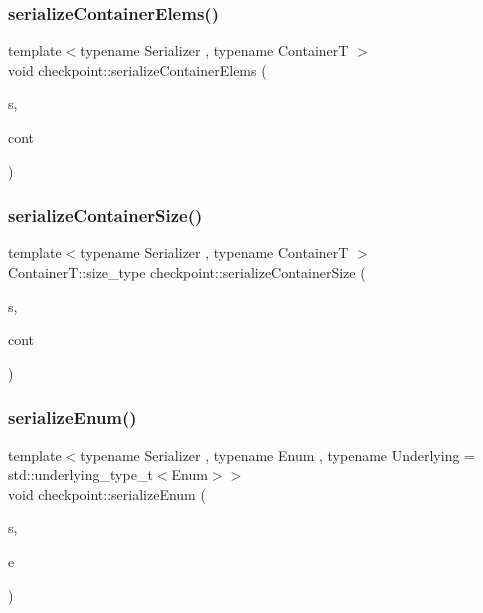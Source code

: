 \subsubsection{\texorpdfstring{serialize\+Container\+Elems()}{serializeContainerElems()}}
{\footnotesize\ttfamily template$<$typename Serializer , typename ContainerT $>$ \\
void checkpoint\+::serialize\+Container\+Elems (\begin{DoxyParamCaption}\item[{\hyperlink{structcheckpoint_1_1_serializer}{Serializer} \&}]{s,  }\item[{ContainerT \&}]{cont }\end{DoxyParamCaption})\hspace{0.3cm}{\ttfamily [inline]}}

\mbox{\label{namespacecheckpoint_a3359595d5a4c6fcf5fc95069c71f869b}} 
\subsubsection{\texorpdfstring{serialize\+Container\+Size()}{serializeContainerSize()}}
{\footnotesize\ttfamily template$<$typename Serializer , typename ContainerT $>$ \\
Container\+T\+::size\+\_\+type checkpoint\+::serialize\+Container\+Size (\begin{DoxyParamCaption}\item[{\hyperlink{structcheckpoint_1_1_serializer}{Serializer} \&}]{s,  }\item[{ContainerT \&}]{cont }\end{DoxyParamCaption})\hspace{0.3cm}{\ttfamily [inline]}}

\mbox{\label{namespacecheckpoint_a5f368cb543eec78bb608a68fe2401562}} 
\subsubsection{\texorpdfstring{serialize\+Enum()}{serializeEnum()}}
{\footnotesize\ttfamily template$<$typename Serializer , typename Enum , typename Underlying  = std\+::underlying\+\_\+type\+\_\+t$<$\+Enum$>$$>$ \\
void checkpoint\+::serialize\+Enum (\begin{DoxyParamCaption}\item[{\hyperlink{structcheckpoint_1_1_serializer}{Serializer} \&}]{s,  }\item[{Enum \&}]{e }\end{DoxyParamCaption})}

